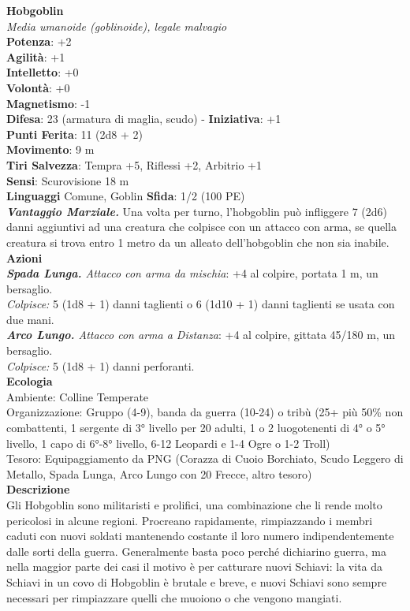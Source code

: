 \begin{multicols}{2}
\medskip\textbf{Hobgoblin}\\
\emph{Media umanoide (goblinoide), legale malvagio}\\
\textbf{Potenza}: +2\\
\textbf{Agilità}: +1\\
\textbf{Intelletto}: +0\\
\textbf{Volontà}: +0\\
\textbf{Magnetismo}: -1\\
\textbf{Difesa}: 23 (armatura di maglia, scudo) - \textbf{Iniziativa}: +1\\
\textbf{Punti Ferita}: 11 (2d8 + 2)\\
\textbf{Movimento}: 9 m\\
\textbf{Tiri Salvezza}: Tempra +5, Riflessi +2, Arbitrio +1\\
\textbf{Sensi}: Scurovisione 18 m\\
\textbf{Linguaggi} Comune, Goblin \textbf{Sfida}: 1/2 (100 PE)\smallskip\\
\emph{\textbf{Vantaggio Marziale.}} Una volta per turno, l'hobgoblin può infliggere 7 (2d6) danni aggiuntivi ad una creatura che colpisce con un attacco con arma, se quella creatura si trova entro 1 metro da un alleato dell'hobgoblin che non sia inabile.\\
\smallskip\textbf{Azioni}\\
\emph{\textbf{Spada Lunga.} Attacco con arma da mischia}: +4 al colpire, portata 1 m, un bersaglio.\\
\emph{Colpisce:} 5 (1d8 + 1) danni taglienti o 6 (1d10 + 1) danni taglienti se usata con due mani.\\
\emph{\textbf{Arco Lungo.} Attacco con arma a Distanza}: +4 al colpire, gittata 45/180 m, un bersaglio.\\
\emph{Colpisce:} 5 (1d8 + 1) danni perforanti.\\
\textbf{Ecologia}\\
Ambiente: Colline Temperate\\
Organizzazione: Gruppo (4-9), banda da guerra (10-24) o tribù (25+ più 50\% non combattenti, 1 sergente di 3° livello per 20 adulti, 1 o 2 luogotenenti di 4° o 5° livello, 1 capo di 6°-8° livello, 6-12 Leopardi e 1-4 Ogre o 1-2 Troll)\\
Tesoro: Equipaggiamento da PNG (Corazza di Cuoio Borchiato, Scudo Leggero di Metallo, Spada Lunga, Arco Lungo con 20 Frecce, altro tesoro)\\
\textbf{Descrizione}\\
Gli Hobgoblin sono militaristi e prolifici, una combinazione che li rende molto pericolosi in alcune regioni. Procreano rapidamente, rimpiazzando i membri caduti con nuovi soldati mantenendo costante il loro numero indipendentemente dalle sorti della guerra. Generalmente basta poco perché dichiarino guerra, ma nella maggior parte dei casi il motivo è per catturare nuovi Schiavi: la vita da Schiavi in un covo di Hobgoblin è brutale e breve, e nuovi Schiavi sono sempre necessari per rimpiazzare quelli che muoiono o che vengono mangiati.\\

\end{multicols}
